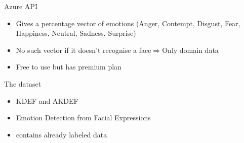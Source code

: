 \documentclass[10pt]{beamer}
\begin{document}
\begin{frame}[fragile]{Azure API}
\begin{itemize}
    \item Gives a percentage vector of emotions (Anger, Contempt, Disgust, Fear, Happiness, Neutral, Sadness, Surprise)
    \item No such vector if it doesn't recognise a face$\Rightarrow$Only domain data
    \item Free to use but has premium plan
\end{itemize}
\end{frame}
\begin{frame}[fragile]{The dataset}
\noindent\begin{minipage}{\textwidth}%
\begin{itemize}
\item KDEF and AKDEF 
\item Emotion Detection from Facial Expressions
\item contains already labeled data
\end{itemize}
\end{minipage}


\end{frame}
\end{document}
